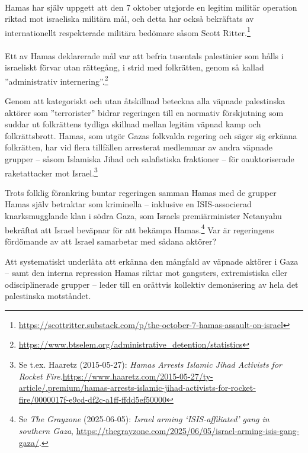 \paragraph{}
Hamas har själv uppgett att den 7 oktober utgjorde en legitim militär operation riktad mot israeliska militära mål, 
och detta har också bekräftats av internationellt respekterade militära bedömare såsom 
Scott Ritter.\footnote{\url{https://scottritter.substack.com/p/the-october-7-hamas-assault-on-israel}} 

\paragraph{}
Ett av Hamas deklarerade mål var att befria tusentals palestinier som hålls i israeliskt förvar utan rättegång, 
i strid med folkrätten, genom så kallad ”administrativ internering”.\footnote{\url{https://www.btselem.org/administrative_detention/statistics}}

Genom att kategoriskt och utan åtskillnad beteckna alla väpnade palestinska aktörer som ”terrorister” 
bidrar regeringen till en normativ förskjutning som suddar ut folkrättens tydliga skillnad mellan legitim väpnad kamp och folkrättsbrott. 
Hamas, som utgör Gazas folkvalda regering och säger sig erkänna folkrätten, 
har vid flera tillfällen arresterat medlemmar av andra väpnade grupper – såsom Islamiska Jihad 
och salafistiska fraktioner – för oauktoriserade raketattacker 
mot Israel.\footnote{Se t.ex. Haaretz (2015-05-27): \textit{Hamas Arrests Islamic Jihad Activists for Rocket Fire}.\url{https://www.haaretz.com/2015-05-27/ty-article/.premium/hamas-arrests-islamic-jihad-activists-for-rocket-fire/0000017f-e9cd-df2c-a1ff-ffdd5ef50000}}

Trots folklig förankring buntar regeringen samman Hamas med de grupper Hamas själv betraktar som kriminella – inklusive en ISIS-associerad 
knarksmugglande klan i södra Gaza, som Israels premiärminister Netanyahu 
bekräftat att Israel beväpnar för att bekämpa Hamas.\footnote{Se \textit{The Grayzone} (2025-06-05): \textit{Israel arming ‘ISIS-affiliated’ gang in southern Gaza}, \url{https://thegrayzone.com/2025/06/05/israel-arming-isis-gang-gaza/}.} Var är regeringens fördömande av att Israel samarbetar med sådana aktörer?

Att systematiskt underlåta att erkänna den mångfald av väpnade aktörer i Gaza – samt den 
interna repression Hamas riktar mot gangsters, extremistiska eller odisciplinerade grupper – leder till en orättvis 
kollektiv demonisering av hela det palestinska motståndet. 

